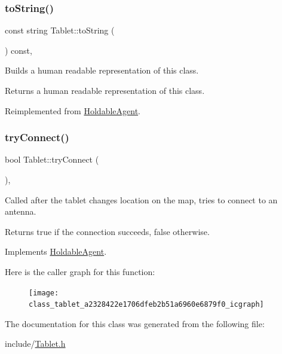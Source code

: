 \subsubsection{\texorpdfstring{to\+String()}{toString()}}
{\footnotesize\ttfamily const string Tablet\+::to\+String (\begin{DoxyParamCaption}{ }\end{DoxyParamCaption}) const\hspace{0.3cm}{\ttfamily [override]}, {\ttfamily [virtual]}}

Builds a human readable representation of this class. \begin{DoxyReturn}{Returns}
a human readable representation of this class. 
\end{DoxyReturn}


Reimplemented from \hyperlink{class_holdable_agent_a2c581226b8994f24b6b2306ae17dbb52}{Holdable\+Agent}.

\mbox{\label{class_tablet_a2328422e1706dfeb2b51a6960e6879f0}} 
\subsubsection{\texorpdfstring{try\+Connect()}{tryConnect()}}
{\footnotesize\ttfamily bool Tablet\+::try\+Connect (\begin{DoxyParamCaption}{ }\end{DoxyParamCaption})\hspace{0.3cm}{\ttfamily [override]}, {\ttfamily [virtual]}}

Called after the tablet changes location on the map, tries to connect to an antenna. \begin{DoxyReturn}{Returns}
true if the connection succeeds, false otherwise. 
\end{DoxyReturn}


Implements \hyperlink{class_holdable_agent_a0789d757d81b43ee016e9362046f6dea}{Holdable\+Agent}.

Here is the caller graph for this function\+:\nopagebreak
\begin{figure}[H]
\begin{center}
\leavevmode
\texttt{[image: class\_tablet\_a2328422e1706dfeb2b51a6960e6879f0\_icgraph]}
\end{center}
\end{figure}


The documentation for this class was generated from the following file\+:\begin{DoxyCompactItemize}
\item 
include/\hyperlink{_tablet_8h}{Tablet.\+h}\end{DoxyCompactItemize}
